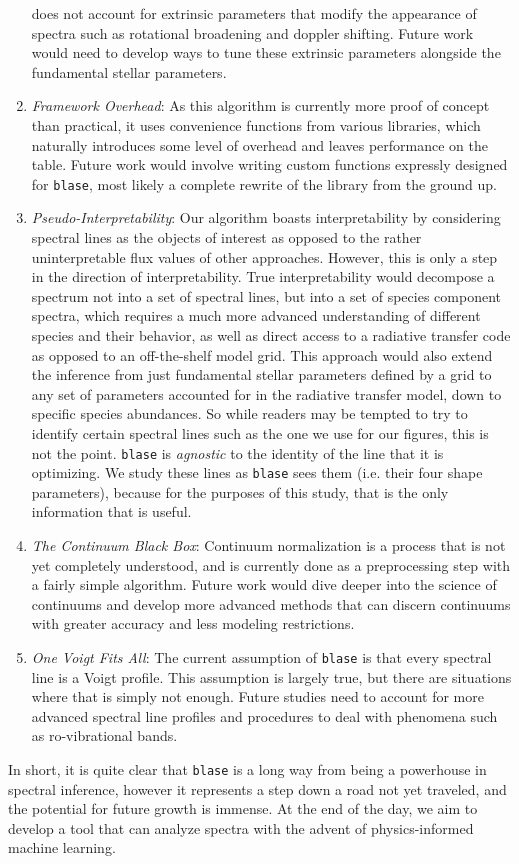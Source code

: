 \documentclass[twocolumn]{aastex631}
\begin{document}
\begin{enumerate}[label=-]
    does not account for extrinsic parameters that modify the appearance of 
    spectra such as rotational broadening and doppler shifting. Future work
    would need to develop ways to tune these extrinsic parameters alongside
    the fundamental stellar parameters.
    \item \textit{Framework Overhead}: As this algorithm is currently more 
    proof of concept than practical, it uses convenience functions from 
    various libraries, which naturally introduces some level of overhead and 
    leaves performance on the table. Future work would involve writing 
    custom functions expressly designed for \texttt{blase}, most likely a 
    complete rewrite of the library from the ground up.
    \item \textit{Pseudo-Interpretability}: Our algorithm boasts interpretability
    by considering spectral lines as the objects of interest as opposed to 
    the rather uninterpretable flux values of other approaches. However, this
    is only a step in the direction of interpretability. True interpretability
    would decompose a spectrum not into a set of spectral lines, but into a
    set of species component spectra, which requires a much more advanced 
    understanding of different species and their behavior, as well as
    direct access to a radiative transfer code as opposed to an off-the-shelf
    model grid. This approach would also extend the inference from just
    fundamental stellar parameters defined by a grid to any set of parameters
    accounted for in the radiative transfer model, down to specific species
    abundances. So while readers may be tempted to try to identify certain 
    spectral lines such as the one we use for our figures, this is not 
    the point. \texttt{blase} is \textit{agnostic} to the identity of the line
    that it is optimizing. We study these lines as \texttt{blase} sees them
    (i.e. their four shape parameters), because for the purposes of this study, 
    that is the only information that is useful.
    \item \textit{The Continuum Black Box}: Continuum normalization is a
    process that is not yet completely understood, and is currently done as 
    a preprocessing step with a fairly simple algorithm. Future work would
    dive deeper into the science of continuums and develop more advanced 
    methods that can discern continuums with greater accuracy and less
    modeling restrictions.
    \item \textit{One Voigt Fits All}: The current assumption of \texttt{blase}
    is that every spectral line is a Voigt profile. This assumption is largely
    true, but there are situations where that is simply not enough. Future
    studies need to account for more advanced spectral line profiles and 
    procedures to deal with phenomena such as ro-vibrational bands.
\end{enumerate}
In short, it is quite clear that \texttt{blase} is a long way from being a
powerhouse in spectral inference, however it represents a step down a road
not yet traveled, and the potential for future growth is immense. At the 
end of the day, we aim to develop a tool that can analyze spectra with the 
advent of physics-informed machine learning.
\end{document}
